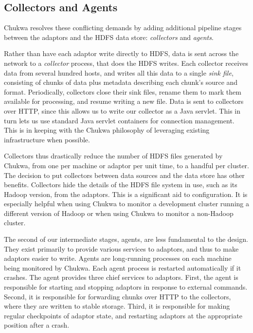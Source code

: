 \documentclass[letterpaper,twocolumn,10pt]{article}
\begin{document}
\subsection{Collectors and Agents}

Chukwa resolves these conflicting demands by adding additional pipeline stages between the adaptors and the HDFS data store: \textit{collectors} and \textit{agents}.

Rather than have each adaptor write directly to HDFS, data is sent across the network to a \textit{collector} process, that does the HDFS writes.  Each collector receives data from several hundred hosts, and writes all this data to a single \textit{sink file}, consisting of chunks of data plus metadata describing each chunk's source and format. Periodically, collectors close their sink files, rename them to mark them available for processing, and resume writing a new file.  Data is sent to collectors over HTTP, since this allows us to write our collector as a Java servlet. This in turn lets us use standard Java servlet containers for connection management. This is in keeping with the Chukwa philosophy of leveraging existing infrastructure when possible. 

Collectors thus drastically reduce the number of HDFS files generated by Chukwa, from one per machine or adaptor per unit time, to a handful per cluster.  The decision to put collectors between data sources and the data store has other benefits. Collectors hide the details of the HDFS file system in use, such as its Hadoop version, from the adaptors.  This is a significant aid to configuration.  It is especially helpful when using Chukwa to monitor a development cluster running a different version of Hadoop or when using Chukwa to monitor a non-Hadoop cluster.  

The second of our intermediate stages, agents, are less fundamental to the design. They exist primarily to provide various services to adaptors, and thus to make adaptors easier to write. Agents are long-running processes on each machine being monitored by Chukwa.  Each agent process is restarted automatically if it crashes. The agent provides three chief services to adaptors. First, the agent is responsible for starting and stopping adaptors in response to external commands.
Second, it is responsible for forwarding chunks over HTTP to the collectors, where they are written to stable storage. 
Third, it is responsible for making regular checkpoints of adaptor state, and restarting adaptors at the appropriate position after a crash.  
\end{document}
